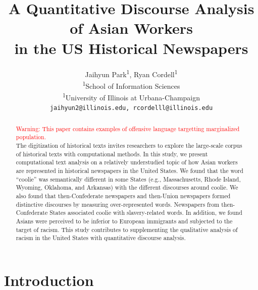 \documentclass[11pt]{article}
\title{A Quantitative Discourse Analysis of Asian Workers \\ in the US Historical Newspapers}
\author{Jaihyun Park\textsuperscript{1}, Ryan Cordell\textsuperscript{1}\\
  \textsuperscript{1}School of Information Sciences\\
  \textsuperscript{1}University of Illinois at Urbana-Champaign\\
  \texttt{jaihyun2@illinois.edu, rcordelll@illinois.edu}}
\begin{document}
\maketitle
\begin{abstract}
\textcolor{red}{Warning: This paper contains examples of offensive language targetting marginalized population.}
\\
The digitization of historical texts invites researchers 
to explore the large-scale corpus of historical texts with computational methods.
In this study, we present computational text analysis on a relatively understudied topic of
how Asian workers are represented in historical newspapers in the United States. We found that the word ``coolie'' 
was semantically different in some States (e.g., Massachusetts, Rhode Island, Wyoming, Oklahoma, and Arkansas)
with the different discourses around coolie. We also found that then-Confederate newspapers and then-Union newspapers
formed distinctive discourses by measuring over-represented words. Newspapers from then-Confederate States
associated coolie with slavery-related words. In addition, we found Asians were perceived to be 
inferior to European immigrants and subjected to the target of racism. This study contributes to supplementing
the qualitative analysis of racism in the United States with quantitative discourse analysis.  


\end{abstract}

\section{Introduction} \label{sec:intro}
\end{document}

